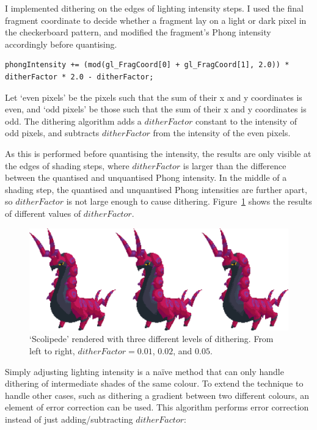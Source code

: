 \documentclass[12pt,twoside,notitlepage]{report}
\begin{document}
I implemented dithering on the edges of lighting intensity steps. I used the final fragment coordinate to decide whether a fragment lay on a light or dark pixel in the checkerboard pattern, and modified the fragment's Phong intensity accordingly before quantising.

\begin{lstlisting}[caption = Simple dithering in GLSL]
phongIntensity += (mod(gl_FragCoord[0] + gl_FragCoord[1], 2.0)) * ditherFactor * 2.0 - ditherFactor;
\end{lstlisting}

Let `even pixels' be the pixels such that the sum of their x and y coordinates is even, and `odd pixels' be those such that the sum of their x and y coordinates is odd. The dithering algorithm adds a $ditherFactor$ constant to the intensity of odd pixels, and subtracts $ditherFactor$ from the intensity of the even pixels.

As this is performed before quantising the intensity, the results are only visible at the edges of shading steps, where $ditherFactor$ is larger than the difference between the quantised and unquantised Phong intensity. In the middle of a shading step, the quantised and unquantised Phong intensities are further apart, so $ditherFactor$ is not large enough to cause dithering. Figure~\ref{fig:scolipededither} shows the results of different values of $ditherFactor$.

\begin{figure}[h!]
\centering
\includegraphics[width=\textwidth]{scolipededither}
\caption{`Scolipede' rendered with three different levels of dithering. From left to right, $ditherFactor = 0.01$, $0.02$, and $0.05$.}
\label{fig:scolipededither}
\end{figure}

Simply adjusting lighting intensity is a na\"{i}ve method that can only handle dithering of intermediate shades of the same colour. To extend the technique to handle other cases, such as dithering a gradient between two different colours, an element of error correction can be used. This algorithm performs error correction instead of just adding/subtracting $ditherFactor$:
\end{document}
